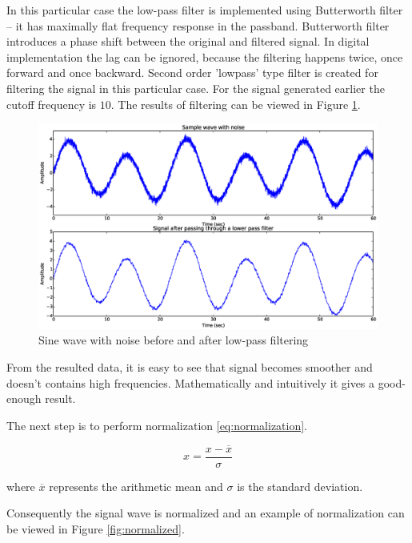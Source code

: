 \documentclass[12pt,a4paper]{report}
\begin{document}
In this particular case the low-pass filter is implemented using Butterworth filter -- it has maximally flat frequency response in the passband. Butterworth filter introduces a phase shift between the original and filtered signal. In digital implementation the lag can be ignored, because the filtering happens twice, once forward and once backward. Second order 'lowpass' type filter is created for filtering the signal in this particular case. For the signal generated earlier the cutoff frequency is $10$. The results of filtering can be viewed in Figure \ref{fig:lowpass}.

\begin{figure}[h]
\centering
  \includegraphics[max height=\textheight, max width=\textwidth, keepaspectratio, scale=0.7]{08_lowpass.eps}
\caption{Sine wave with noise before and after low-pass filtering}
\label{fig:lowpass}
\end{figure}

From the resulted data, it is easy to see that signal becomes smoother and doesn't contains high frequencies. Mathematically and intuitively it gives a good-enough result. 

The next step is to perform normalization \eqref{eq:normalization}.

\begin{equation} \label{eq:normalization}
 x = \frac{x - \overline{x}}{\sigma}
\end{equation}

where $\overline{x}$ represents the arithmetic mean and $\sigma$ is the standard deviation. 

Consequently the signal wave is normalized and an example of normalization can be viewed in Figure \ref{fig:normalized}.
\end{document}
